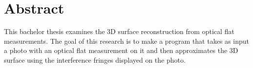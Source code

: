 \documentclass[../main.tex]{subfiles}
\begin{document}
    \chapter{Abstract}
    This bachelor thesis examines the 3D surface reconstruction from optical flat measurements. The goal of this research is to make a program that takes as input a photo with an optical flat measurement on it and then approximates the 3D surface using the interference fringes displayed on the photo.
\end{document}
